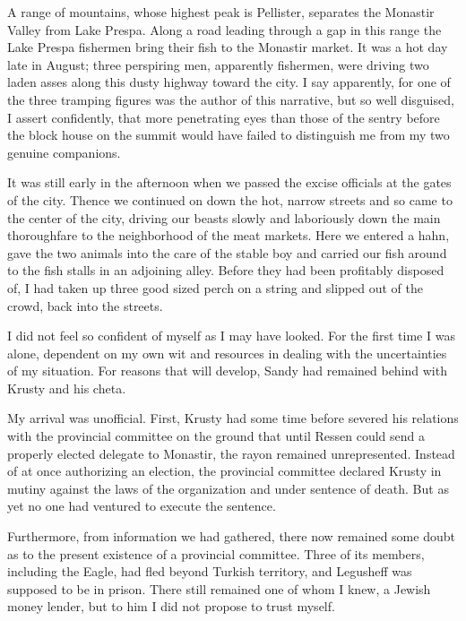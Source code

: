 \documentclass[a5paper,12pt]{book}
\begin{document}
A range of mountains, whose highest peak is Pellister, separates the Monastir Valley from Lake Prespa. Along a road leading through a gap in this range the Lake Prespa fishermen bring their fish to the Monastir market. It was a hot day late in August; three perspiring men, apparently fishermen, were driving two laden asses along this dusty highway toward the city. I say apparently, for one of the three tramping figures was the author of this narrative, but so well disguised, I assert confidently, that more penetrating eyes than those of the sentry before the block house on the summit would have failed to distinguish me from my two genuine companions.

It was still early in the afternoon when we passed the excise officials at the gates of the city. Thence we continued on down the hot, narrow streets and so came to the center of the city, driving our beasts slowly and laboriously down the main thoroughfare to the neighborhood of the meat markets. Here we entered a hahn, gave the two animals into the care of the stable boy and carried our fish around to the fish stalls in an adjoining alley. Before they had been profitably disposed of, I had taken up three good sized perch on a string and slipped out of the crowd, back into the streets.

I did not feel so confident of myself as I may have looked. For the first time I was alone, dependent on my own wit and resources in dealing with the uncertainties of my situation. For reasons that will develop, Sandy had remained behind with Krusty and his cheta.

My arrival was unofficial. First, Krusty had some time before severed his relations with the provincial committee on the ground that until Ressen could send a properly elected delegate to Monastir, the rayon remained unrepresented. Instead of at once authorizing an election, the provincial committee declared Krusty in mutiny against the laws of the organization and under sentence of death. But as yet no one had ventured to execute the sentence.

Furthermore, from information we had gathered, there now remained some doubt as to the present existence of a provincial committee. Three of its members, including the Eagle, had fled beyond Turkish territory, and Legusheff was supposed to be in prison. There still remained one of whom I knew, a Jewish money lender, but to him I did not propose to trust myself.
\end{document}
